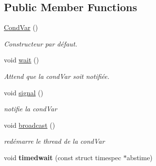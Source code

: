 \subsection*{Public Member Functions}
\begin{DoxyCompactItemize}
\item 
\hypertarget{classmognetwork_1_1_cond_var_ab7f3756ed998d61f8c4eec3d1f3a984b}{\hyperlink{classmognetwork_1_1_cond_var_ab7f3756ed998d61f8c4eec3d1f3a984b}{Cond\-Var} ()}\label{classmognetwork_1_1_cond_var_ab7f3756ed998d61f8c4eec3d1f3a984b}

\begin{DoxyCompactList}\small\item\em Constructeur par défaut. \end{DoxyCompactList}\item 
\hypertarget{classmognetwork_1_1_cond_var_afaee9fd061be682985bdc15d45e11816}{void \hyperlink{classmognetwork_1_1_cond_var_afaee9fd061be682985bdc15d45e11816}{wait} ()}\label{classmognetwork_1_1_cond_var_afaee9fd061be682985bdc15d45e11816}

\begin{DoxyCompactList}\small\item\em Attend que la cond\-Var soit notifiée. \end{DoxyCompactList}\item 
\hypertarget{classmognetwork_1_1_cond_var_aeb5e8e751376a09f36c115e342778d3f}{void \hyperlink{classmognetwork_1_1_cond_var_aeb5e8e751376a09f36c115e342778d3f}{signal} ()}\label{classmognetwork_1_1_cond_var_aeb5e8e751376a09f36c115e342778d3f}

\begin{DoxyCompactList}\small\item\em notifie la cond\-Var \end{DoxyCompactList}\item 
\hypertarget{classmognetwork_1_1_cond_var_ae407b095e176f8c360d1f03ceaac1ad7}{void \hyperlink{classmognetwork_1_1_cond_var_ae407b095e176f8c360d1f03ceaac1ad7}{broadcast} ()}\label{classmognetwork_1_1_cond_var_ae407b095e176f8c360d1f03ceaac1ad7}

\begin{DoxyCompactList}\small\item\em redémarre le thread de la cond\-Var \end{DoxyCompactList}\item 
\hypertarget{classmognetwork_1_1_cond_var_a75efe016cf3ea093555f302bd980ad34}{void {\bfseries timedwait} (const struct timespec $\ast$abstime)}\label{classmognetwork_1_1_cond_var_a75efe016cf3ea093555f302bd980ad34}

\end{DoxyCompactItemize}

